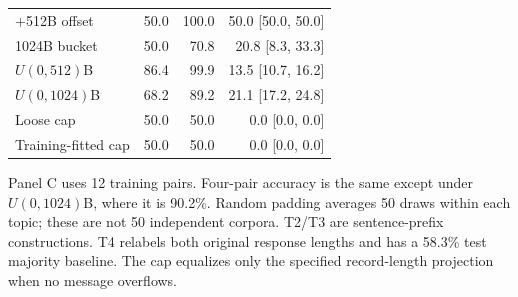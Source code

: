 \begin{table}[!t]
\begin{tabularx}{\columnwidth}{@{}Yrrr@{}}
+512B offset & 50.0 & 100.0 & 50.0 [50.0, 50.0]\\
1024B bucket & 50.0 & 70.8 & 20.8 [8.3, 33.3]\\
$U(0,512)$B & 86.4 & 99.9 & 13.5 [10.7, 16.2]\\
$U(0,1024)$B & 68.2 & 89.2 & 21.1 [17.2, 24.8]\\
Loose cap & 50.0 & 50.0 & 0.0 [0.0, 0.0]\\
Training-fitted cap & 50.0 & 50.0 & 0.0 [0.0, 0.0]\\
\bottomrule\end{tabularx}
\par\smallskip\raggedright\footnotesize
Panel C uses 12 training pairs. Four-pair accuracy is the same except under $U(0,1024)$B, where it is 90.2\%. Random padding averages 50 draws within each topic; these are not 50 independent corpora. T2/T3 are sentence-prefix constructions. T4 relabels both original response lengths and has a 58.3\% test majority baseline. The cap equalizes only the specified record-length projection when no message overflows.
\end{table}
